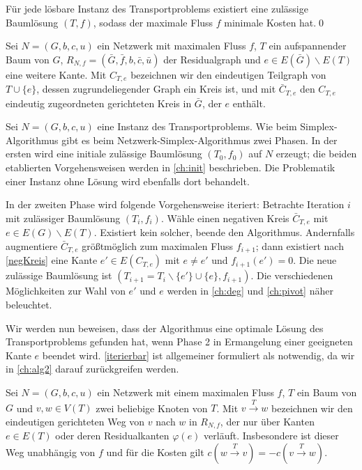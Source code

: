 \begin{kor}\label{TP}Für jede lösbare Instanz des Transportproblems existiert eine zulässige Baumlösung $(T,f)$, sodass der maximale Fluss $f$ minimale Kosten hat.\qed\end{kor}

\begin{nota}Sei $N=(G,b,c,u)$ ein Netzwerk mit maximalen Fluss $f$, $T$ ein aufspannender Baum von $G$, $R_{N,f}=(\bar{G},\bar{f},b,\bar{c},\bar{u})$ der Residualgraph und $e\in E(\bar{G})\backslash E(T)$ eine weitere Kante. Mit $C_{T,e}$ bezeichnen wir den eindeutigen Teilgraph von $T\cup\{e\}$, dessen zugrundeliegender Graph ein Kreis ist, und mit $\bar{C}_{T,e}$ den $C_{T,e}$ eindeutig zugeordneten gerichteten Kreis in $\bar{G}$, der $e$ enthält.\end{nota}

Sei $N=(G,b,c,u)$ eine Instanz des Transportproblems. Wie beim Simplex-Algorithmus gibt es beim Netzwerk-Simplex-Algorithmus zwei Phasen. In der ersten wird eine initiale zulässige Baumlösung $(T_0,f_0)$ auf $N$ erzeugt; die beiden etablierten Vorgehensweisen werden in \cref{ch:init} beschrieben. Die Problematik einer Instanz ohne Lösung wird ebenfalls dort behandelt.

In der zweiten Phase wird folgende Vorgehensweise iteriert: Betrachte Iteration $i$ mit zulässiger Baumlösung $(T_i,f_i)$. Wähle einen negativen Kreis $\bar{C}_{T,e}$ mit $e\in E(G)\backslash E(T)$. Existiert kein solcher, beende den Algorithmus. Andernfalls augmentiere $\bar{C}_{T,e}$ größtmöglich zum maximalen Fluss $f_{i+1}$; dann existiert nach \cref{negKreis} eine Kante $e'\in E(C_{T,e})$ mit $e\neq e'$ und $f_{i+1}(e')=0$. Die neue zulässige Baumlösung ist $(T_{i+1}=T_i\backslash\{e'\}\cup\{e\},f_{i+1})$. Die verschiedenen Möglichkeiten zur Wahl von $e'$ und $e$ werden in \cref{ch:deg} und \cref{ch:pivot} näher beleuchtet.

Wir werden nun beweisen, dass der Algorithmus eine optimale Lösung des Transportproblems gefunden hat, wenn Phase 2 in Ermangelung einer geeigneten Kante $e$ beendet wird. \cref{iterierbar} ist allgemeiner formuliert als notwendig, da wir in \cref{ch:alg2} darauf zurückgreifen werden.

\begin{nota}Sei $N=(G,b,c,u)$ ein Netzwerk mit einem maximalen Fluss $f$, $T$ ein Baum von $G$ und $v,w\in V(T)$ zwei beliebige Knoten von $T$. Mit $v\xrightarrow{T}w$ bezeichnen wir den eindeutigen gerichteten Weg von $v$ nach $w$ in $R_{N,f}$, der nur über Kanten $e\in E(T)$ oder deren Residualkanten $\varphi(e)$ verläuft. Insbesondere ist dieser Weg unabhängig von $f$ und für die Kosten gilt $c(w\xrightarrow{T}v) = -c(v\xrightarrow{T}w)$.\end{nota}

